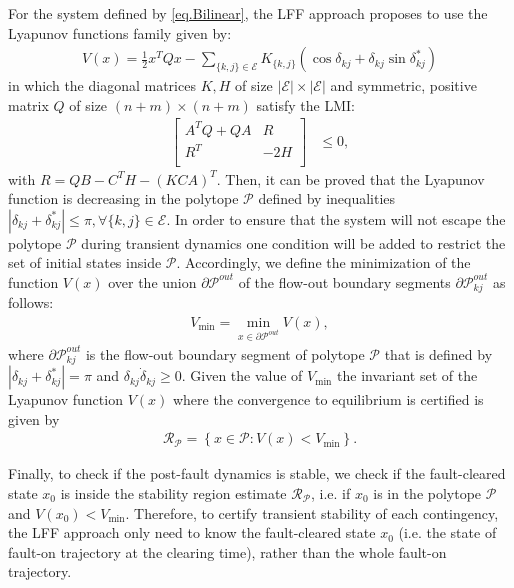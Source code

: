 \documentclass[final]{IEEEtran}
\begin{document}
For the system defined by \eqref{eq.Bilinear}, the LFF approach
proposes to use the Lyapunov functions family  given by:
\begin{align} \label{eq.Lyapunov}
V(x) = \frac{1}{2}x^T Q x - \sum_{\{k,j\}\in \mathcal{E}}
K_{\{k,j\}} \left(\cos\delta_{kj}
+\delta_{kj}\sin\delta_{kj}^*\right)
\end{align}
in which  the diagonal matrices $K, H$ of size
$|\mathcal{E}|\times|\mathcal{E}|$ and symmetric, positive matrix
$Q$ of size $(n+m)\times (n+m)$ satisfy the LMI:
\begin{align}
\label{eq.QKH}
    \left[   \begin{array}{ccccc}
          A^TQ+QA  & R \\
          R^T  & -2H\\
        \end{array}\right] &\le 0,
  \end{align}
with $R = QB-C^TH-(KCA)^T$. Then, it can be proved that the
Lyapunov function is decreasing in the polytope $\mathcal{P}$
defined by inequalities $|\delta_{kj}+\delta_{kj}^*| \le \pi,
\forall \{k,j\} \in \mathcal{E}.$ In order to ensure that the
system will not escape the polytope $\mathcal{P}$ during transient
dynamics one condition will be added to restrict the set of initial
states inside $\mathcal{P}.$ Accordingly, we define the minimization
of the function $V(x)$ over the union $\partial\mathcal{P}^{out}$
of the flow-out boundary segments
$\partial\mathcal{P}_{kj}^{out}$ as follows:
\begin{align}\label{eq.Vmin1}
 V_{\min}=\mathop {\min}\limits_{x \in \partial\mathcal{P}^{out}} V(x),
\end{align}
where $\partial\mathcal{P}_{kj}^{out}$ is the flow-out boundary
segment of polytope $\mathcal{P}$ that is defined by $|\delta_{kj}
+\delta_{kj}^*| = \pi$ and $\delta_{kj}\dot{\delta}_{kj} \ge 0$.
Given the value of $V_{\min}$ the invariant set of the Lyapunov
function $V(x)$ where the convergence to equilibrium is certified
is given by
\begin{align}\label{eq.invariant}
 \mathcal{R_P} = \left\{x \in\mathcal{P}: V(x) < V_{\min}\right\}.
\end{align}


Finally, to check if the post-fault dynamics is stable, we check if the fault-cleared state
$x_0$  is inside the stability region estimate $\mathcal{R_P}$, i.e. if $x_0$ is in the polytope
$\mathcal{P}$ and $V(x_0) < V_{\min}.$ Therefore, to certify
transient stability of each contingency, the LFF approach only
need to know the fault-cleared state $x_0$ (i.e. the state of
fault-on trajectory at the clearing time), rather than the whole
fault-on trajectory.
\end{document}
